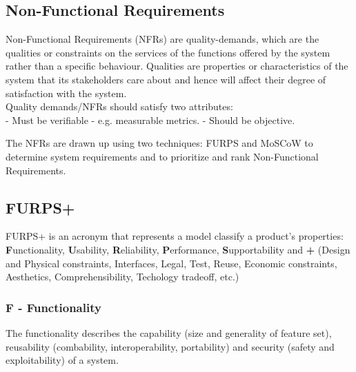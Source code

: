 



\subsection{Non-Functional Requirements}
Non-Functional Requirements (NFRs) are quality-demands, which are the qualities or constraints on the services of the functions offered by the system rather than a specific behaviour. Qualities are properties or characteristics of the system that its stakeholders care about and hence will affect their degree of satisfaction with the system. \\
Quality demands/NFRs should satisfy two attributes: \\
- Must be verifiable - e.g. measurable metrics.
- Should be objective. \newline

The NFRs are drawn up using two techniques: FURPS and MoSCoW to determine system requirements and to prioritize and rank Non-Functional Requirements. \\

\subsection{FURPS+}
FURPS+ is an acronym that represents a model classify a product's properties: \textbf{F}unctionality, \textbf{U}sability, \textbf{R}eliability, \textbf{P}erformance, \textbf{S}upportability and \textbf{+} (Design and Physical constraints, Interfaces, Legal, Test, Reuse, Economic constraints, Aesthetics, Comprehensibility, Techology tradeoff, etc.)  \\

\subsubsection{\textbf{F} - Functionality}
The functionality describes the capability (size and generality of feature set), reusability (combability, interoperability, portability) and security (safety and exploitability) of a system. \\

